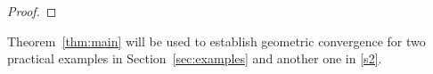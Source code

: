 \documentclass[12pt]{article}
\newcommand{\df}{\mathrm{d}}
\newcommand{\Z}{\mathsf{Z}}
\begin{document}
\begin{proof}
	
	
	
\end{proof}

Theorem~\ref{thm:main} will be used to establish geometric convergence for two practical examples in Section~\ref{sec:examples} and another one in \ref{s2}.
\end{document}
